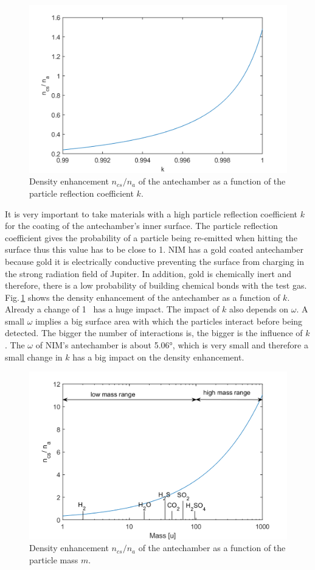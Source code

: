 	\begin{figure}[h] %
		\centering
		\includegraphics[width= .7\textwidth]{Bilder/k.png}
		\caption{Density enhancement $n_{cs}/n_a$ of the antechamber as a function of the particle reflection coefficient $k$.}
		\label{th:densEnhk}
	\end{figure}
	It is very important to take materials with a high particle reflection coefficient $k$ for the coating of the antechamber's inner surface. The particle reflection coefficient gives the probability of a particle being re-emitted when hitting the surface thus this value has to be close to 1. NIM has a gold coated antechamber because gold it is electrically conductive preventing the surface from charging in the strong radiation field of Jupiter. In addition, gold is chemically inert and therefore, there is a low probability of building chemical bonds with the test gas. Fig.\,\ref{th:densEnhk} shows the density enhancement of the antechamber as a function of $k$. Already a change of 1\textperthousand~ has a huge impact. The impact of $k$ also depends on $\omega$. A small $\omega$ implies a big surface area with which the particles interact before being detected. The bigger the number of interactions is, the bigger is the influence of $k$. The $\omega$ of NIM's antechamber is about 5.06°, which is very small and therefore a small change in $k$ has a big impact on the density enhancement.\\
	\begin{figure}[h!] %
		\centering
		\includegraphics[width= .7\textwidth]{Bilder/mV1.png}
		\caption{Density enhancement $n_{cs}/n_a$ of the antechamber as a function of the particle mass $m$.}
		\label{th:densEnhm}
	\end{figure}
